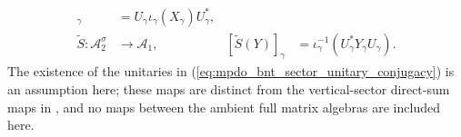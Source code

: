 \begin{definition}
\begin{align}
        [\widetilde T(X)]_\gamma
                                               & =U_\gamma\iota_\gamma(X_\gamma)U_\gamma^*,
        \label{eq:mpdo_bnt_direct_sum_unitary_T}
        \\
        \widetilde S\colon \mathcal A_2^\sigma & \longrightarrow\mathcal A_1,
                                               &
        [\widetilde S(Y)]_\gamma
                                               & =\iota_\gamma^{-1}
        (U_\gamma^*Y_\gamma U_\gamma).
        \label{eq:mpdo_bnt_direct_sum_unitary_S}
    \end{align}
    The existence of the unitaries in
    (\ref{eq:mpdo_bnt_sector_unitary_conjugacy}) is an assumption here;
    these maps are distinct from the vertical-sector direct-sum maps in
    \cite[Appendix~C.4, lines~1955--1997]{Cirac2016MPDO_arXiv}, and no maps
    between the ambient full matrix algebras are included here.
\end{definition}

